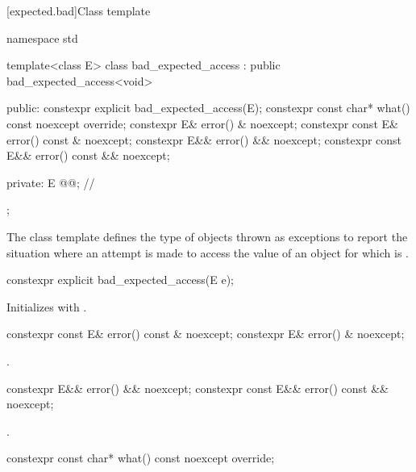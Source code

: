 [expected.bad]{Class template }

%
\begin{codeblock}
namespace std {
  template<class E>
  class bad_expected_access : public bad_expected_access<void> {
  public:
    constexpr explicit bad_expected_access(E);
    constexpr const char* what() const noexcept override;
    constexpr E& error() & noexcept;
    constexpr const E& error() const & noexcept;
    constexpr E&& error() && noexcept;
    constexpr const E&& error() const && noexcept;

  private:
    E @@;             // \expos
  };
}
\end{codeblock}

\pnum
The class template 
defines the type of objects thrown as exceptions to report the situation
where an attempt is made to access the value of an  object
for which  is .

%
\begin{itemdecl}
constexpr explicit bad_expected_access(E e);
\end{itemdecl}

\begin{itemdescr}
\pnum
\effects
Initializes  with .
\end{itemdescr}

%
\begin{itemdecl}
constexpr const E& error() const & noexcept;
constexpr E& error() & noexcept;
\end{itemdecl}

\begin{itemdescr}
\pnum
\returns
{}.
\end{itemdescr}

%
\begin{itemdecl}
constexpr E&& error() && noexcept;
constexpr const E&& error() const && noexcept;
\end{itemdecl}

\begin{itemdescr}
\pnum
\returns
{}.
\end{itemdescr}

%
\begin{itemdecl}
constexpr const char* what() const noexcept override;
\end{itemdecl}

